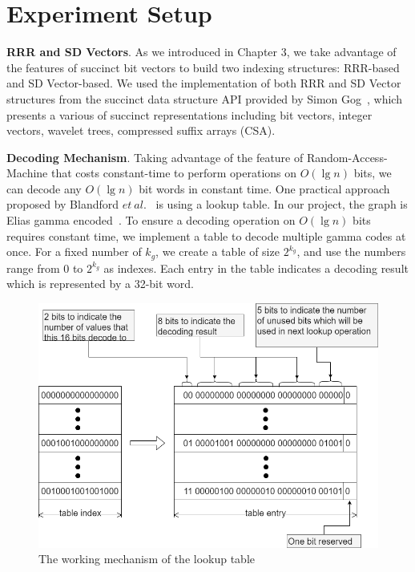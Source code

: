 \documentclass[12pt,glossary]{dalthesis}
\begin{document}
\bigskip
 
\section{Experiment Setup}

\bigskip
\textbf{RRR and SD Vectors}. As we introduced in Chapter 3, we take advantage of the features of succinct bit vectors to build two indexing structures: RRR-based and SD Vector-based. We used the implementation of both RRR and SD Vector structures from the succinct data structure API provided by Simon Gog~\cite{sdsl}, which presents a various of succinct representations including bit vectors, integer vectors, wavelet trees, compressed suffix arrays (CSA). 

\bigskip
\bigskip

\textbf{Decoding Mechanism}. Taking advantage of the feature of Random-Access-Machine that costs constant-time to perform operations on $O(\lg n)$ bits, we can decode any $O(\lg n)$ bit words in constant time. One practical approach proposed by Blandford $et \ al.$~\cite{compact-representation} is using a lookup table. In our project, the graph is Elias gamma encoded~\cite{Gamma}. To ensure a decoding operation on $O(\lg n)$ bits requires constant time, we implement a table to decode multiple gamma codes at once. For a fixed number of $k_{g}$, we create a table of size $2^{k_{g}}$, and use the numbers range from 0 to $2^{k_{g}}$ as indexes. Each entry in the table indicates a decoding result which is represented by a 32-bit word.  

\bigskip

\begin{figure}[ht]
\centering
\includegraphics[width=1.0\textwidth]{Decoding}
\caption{The working mechanism of the lookup table}
\end{figure}
\end{document}
